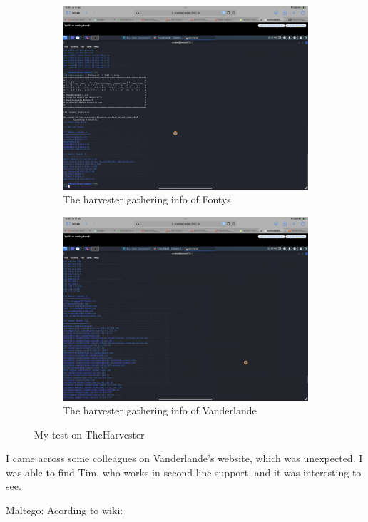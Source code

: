\documentclass[12pt, letterpaper]{article}
\begin{document}
\begin{figure}[!ht]
\begin{subfigure}{0.45\textwidth}
        \includegraphics[width=0.9\linewidth]{PDFs/Week 2/Theharvest-fontys.png}
        \caption{The harvester gathering info of Fontys}
    \end{subfigure}
    \begin{subfigure}{0.45\textwidth}
        \centering
        \includegraphics[width=0.9\linewidth]{PDFs/Week 2/Theharvester-vanderlande.png}
        \caption{The harvester gathering info of Vanderlande}
    \end{subfigure}
    \caption{My test on TheHarvester}
\end{figure}
I came across some colleagues on Vanderlande's website, which was unexpected. I was able to find Tim, who works in second-line support, and it was interesting to see.

\newpage
Maltego:
\hfill\break
\hfill\break
Acording to wiki:
\end{document}
